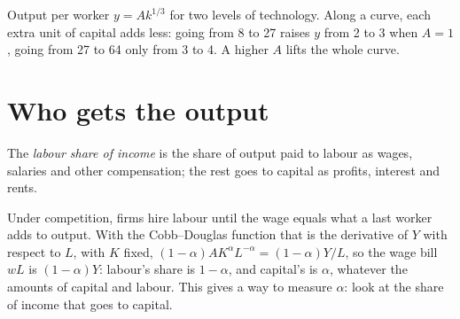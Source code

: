 \begin{omfigure}

{\small Output per worker $y = Ak^{1/3}$ for two levels of technology. Along a curve, each extra unit of capital adds less: going from 8 to 27 raises $y$ from 2 to 3 when $A = 1$,
going from 27 to 64 only from 3 to 4. A higher $A$ lifts the whole curve.}
\end{omfigure}

\section{Who gets the output}\label{sec:g12:growth-and-production-function:shares}

\begin{definition}\label{def:g12:growth-and-production-function:labour-share}
The \emph{labour share of income} is the share of output paid to labour as wages, salaries and other compensation; the rest goes to capital
as profits, interest and rents.
\end{definition}

Under competition, firms hire labour until the wage equals what a last worker adds to output. With the Cobb--Douglas function that is the derivative of $Y$ with respect to $L$, with $K$ fixed,
$(1 - \alpha)AK^{\alpha}L^{-\alpha} = (1 - \alpha)Y/L$, so the wage bill $wL$ is $(1 - \alpha)Y$: labour's share is $1 - \alpha$, and capital's is $\alpha$, whatever the amounts of capital and labour. This
gives a way to measure $\alpha$: look at the share of income that goes to capital.

